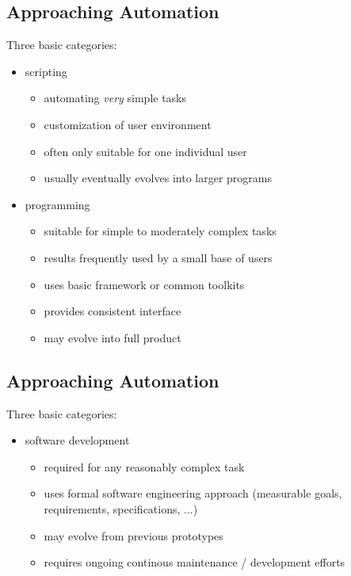\documentclass[xga]{xdvislides}
\begin{document}
\subsection{Approaching Automation}
Three basic categories:
\\

\begin{itemize}
	\item scripting
		\begin{itemize}
			\item automating {\em very} simple tasks
			\item customization of user environment
			\item often only suitable for one individual user
			\item usually eventually evolves into larger programs
		\end{itemize}
	\item programming
		\begin{itemize}
			\item suitable for simple to moderately complex tasks
			\item results frequently used by a small base of users
			\item uses basic framework or common toolkits
			\item provides consistent interface
			\item may evolve into full product
		\end{itemize}
\end{itemize}


\subsection{Approaching Automation}
Three basic categories:
\\

\begin{itemize}
	\item software development
		\begin{itemize}
			\item required for any reasonably complex task
			\item uses formal software engineering approach (measurable goals,
				requirements, specifications, ...)
			\item may evolve from previous prototypes
			\item requires ongoing continous maintenance / development efforts
		\end{itemize}
\end{itemize}
\end{document}
